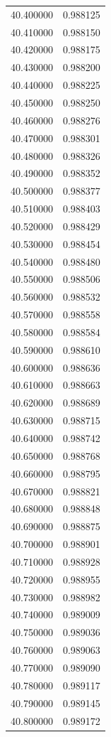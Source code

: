 \begin{tabular}{rr}
40.400000 & 0.988125 \\
40.410000 & 0.988150 \\
40.420000 & 0.988175 \\
40.430000 & 0.988200 \\
40.440000 & 0.988225 \\
40.450000 & 0.988250 \\
40.460000 & 0.988276 \\
40.470000 & 0.988301 \\
40.480000 & 0.988326 \\
40.490000 & 0.988352 \\
40.500000 & 0.988377 \\
40.510000 & 0.988403 \\
40.520000 & 0.988429 \\
40.530000 & 0.988454 \\
40.540000 & 0.988480 \\
40.550000 & 0.988506 \\
40.560000 & 0.988532 \\
40.570000 & 0.988558 \\
40.580000 & 0.988584 \\
40.590000 & 0.988610 \\
40.600000 & 0.988636 \\
40.610000 & 0.988663 \\
40.620000 & 0.988689 \\
40.630000 & 0.988715 \\
40.640000 & 0.988742 \\
40.650000 & 0.988768 \\
40.660000 & 0.988795 \\
40.670000 & 0.988821 \\
40.680000 & 0.988848 \\
40.690000 & 0.988875 \\
40.700000 & 0.988901 \\
40.710000 & 0.988928 \\
40.720000 & 0.988955 \\
40.730000 & 0.988982 \\
40.740000 & 0.989009 \\
40.750000 & 0.989036 \\
40.760000 & 0.989063 \\
40.770000 & 0.989090 \\
40.780000 & 0.989117 \\
40.790000 & 0.989145 \\
40.800000 & 0.989172 \\

\end{tabular}
